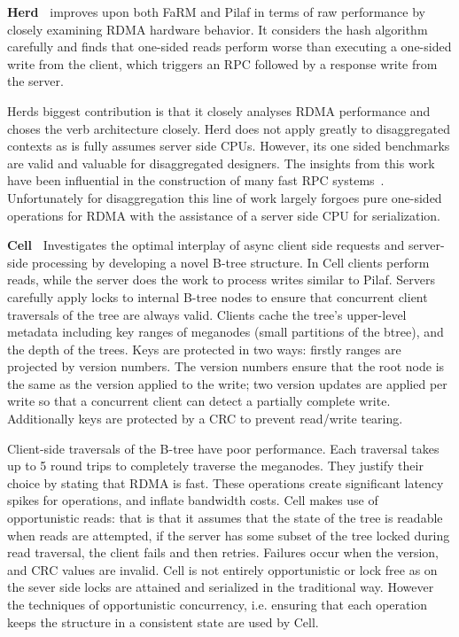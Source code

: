 \textbf{Herd~\cite{herd}} improves upon both FaRM and Pilaf in terms of raw
performance by closely examining RDMA hardware behavior. It considers the hash
algorithm carefully and finds that one-sided reads perform worse than executing
a one-sided write from the client, which triggers an RPC followed by a response
write from the server.

Herds biggest contribution is that it closely analyses RDMA performance and
choses the verb architecture closely. Herd does not apply greatly to
disaggregated contexts as is fully assumes server side CPUs. However, its one
sided benchmarks are valid and valuable for disaggregated designers. The
insights from this work have been influential in the construction of many fast
RPC systems~\cite{erpc,faast,storm,1rma}. Unfortunately for disaggregation this
line of work largely forgoes pure one-sided operations for RDMA with the
assistance of a server side CPU for serialization.

\textbf{Cell~\cite{cell}} Investigates the optimal interplay of async client
side requests and server-side processing by developing a novel B-tree structure.
In Cell clients perform reads, while the server does the work to process writes
similar to Pilaf.
%
Servers carefully apply locks to internal B-tree nodes to ensure that concurrent
client traversals of the tree are always valid. Clients cache the tree's
upper-level metadata including key ranges of meganodes (small partitions of the
btree), and the depth of the trees.
%
Keys are protected in two ways: firstly ranges are projected by version numbers.
The version numbers ensure that the root node is the same as the version applied
to the write; two version updates are applied per write so that a concurrent
client can detect a partially complete write. Additionally keys are protected by
a CRC to prevent read/write tearing.

Client-side traversals of the B-tree have poor performance. Each traversal takes
up to 5 round trips to completely traverse the meganodes. They justify their
choice by stating that RDMA is fast. These operations create significant latency
spikes for operations, and inflate bandwidth costs.
%
Cell makes use of opportunistic reads: that is that it assumes that the state of
the tree is readable when reads are attempted, if the server has some subset of
the tree locked during read traversal, the client fails and then retries.
Failures occur when the version, and CRC values are invalid. Cell is not
entirely opportunistic or lock free as on the sever side locks are attained and
serialized in the traditional way. However the techniques of opportunistic
concurrency, i.e. ensuring that each operation keeps the structure in a
consistent state are used by Cell.



